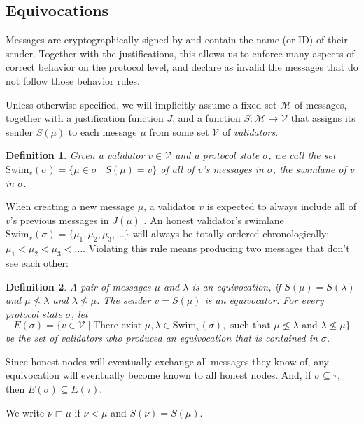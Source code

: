\documentclass[12pt, fleqn]{article}
\newtheorem{definition}{Definition}
\begin{document}
\subsection{Equivocations}

Messages are cryptographically signed by and contain the name (or ID) of their sender. Together with the justifications, this allows us to enforce many aspects of correct behavior on the protocol level, and declare as invalid the messages that do not follow those behavior rules.

Unless otherwise specified, we will implicitly assume a fixed set $\mathcal{M}$ of messages, together with a justification function $J$, and a function $S: \mathcal{M} \rightarrow \mathcal{V}$ that assigns its sender $S(\mu)$ to each message $\mu$ from some set $\mathcal{V}$ of \emph{validators}.

\begin{definition}
Given a validator $v \in \mathcal{V}$ and a protocol state $\sigma$, we call the set $\mathrm{Swim}_v(\sigma) = \{ \mu \in \sigma \mid S(\mu) = v \}$ of all of $v$'s messages in $\sigma$, the \emph{swimlane of $v$ in $\sigma$}.
\end{definition}

When creating a new message $\mu$, a validator $v$ is expected to always include all of $v$'s previous messages in $J(\mu)$ .  An honest validator's swimlane $\mathrm{Swim}_v(\sigma) = \{\mu_1, \mu_2, \mu_3, \ldots \}$ will always be totally ordered chronologically: $\mu_1 < \mu_2 < \mu_3 < \ldots$. Violating this rule means producing two messages that don't see each other:

\begin{definition}
A pair of messages $\mu$ and $\lambda$ is an \emph{equivocation}, if $S(\mu) = S(\lambda)$ and $\mu \not\leq \lambda$ and $\lambda \not\leq \mu$. The sender $v = S(\mu)$ is an \emph{equivocator}. For every protocol state $\sigma$, let
  $$E(\sigma) = \{v\in\mathcal{V} \mid \text{There exist } \mu, \lambda \in \mathrm{Swim}_v(\sigma), \text{ such that } \mu \not\leq \lambda \text{ and } \lambda \not\leq \mu\}$$
be the set of validators who produced an equivocation that is contained in $\sigma$.
\end{definition}

Since honest nodes will eventually exchange all messages they know of, any equivocation will eventually become known to all honest nodes. And, if $\sigma \subseteq \tau$, then $E(\sigma) \subseteq E(\tau)$.

We write $\nu \sqsubset \mu$ if $\nu < \mu$ and $S(\nu) = S(\mu)$.
\end{document}
